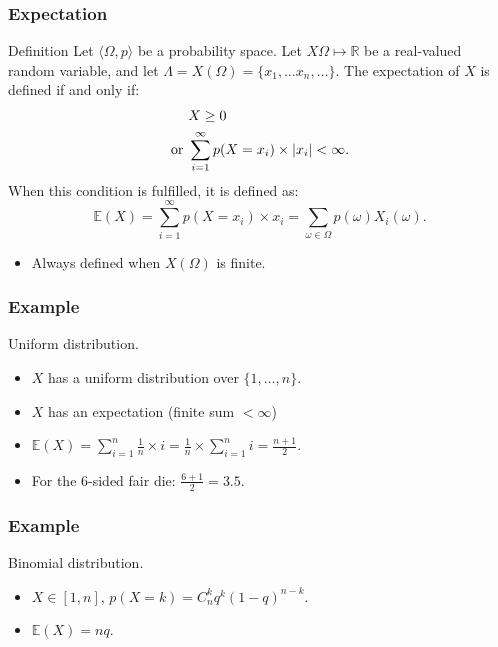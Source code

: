 \documentclass{beamer}
\begin{document}
\begin{frame}
  \frametitle{Expectation}
  \begin{block}{Definition}
    Let $\langle \Omega, p \rangle$ be a probability space. Let $X \Omega \mapsto \mathbb{R}$ be a real-valued random variable, and let $\Lambda = X(\Omega) = \{x_1, \dots x_n, \dots\}$. The expectation of $X$ is defined if and only if:
    \[\begin{aligned} &X \ge 0\\\textnormal{or }&\sum^{\infty}_{i=1} p(X = x_i) \times |x_i| < \infty.\end{aligned}\]
    When this condition is fulfilled, it is defined as:
    \[\mathbb{E}(X) = \sum^{\infty}_{i=1} p(X = x_i) \times x_i = \sum_{\omega \in \Omega} p(\omega) X_i(\omega) .\]
  \end{block}
  \begin{itemize}
  \item \alert{Always defined when $X(\Omega)$ is finite.}
  \end{itemize}
\end{frame}

\begin{frame}
  \frametitle{Example}
  \begin{exampleblock}{Uniform distribution.}
    \begin{itemize}
    \item $X$ has a uniform distribution over $\{1, \dots, n\}$.
    \item $X$ has an expectation (finite sum $< \infty$)
    \item $\mathbb{E}(X) = \sum^n_{i=1} \frac{1}{n} \times i = \frac{1}{n} \times \sum^n_{i = 1} i = \frac{n+1}{2}$.     
    \item For the $6$-sided fair die: $\frac{6+1}{2} = 3.5$.
    \end{itemize}
  \end{exampleblock}
\end{frame}

\begin{frame}
  \frametitle{Example}
  \begin{exampleblock}{Binomial distribution.}
    \begin{itemize}
    \item $X \in [1,n]$, $p(X = k) = C^k_n q^k(1-q)^{n-k}$.
    \item $\mathbb{E}(X) = nq$.
    \end{itemize}
  \end{exampleblock}
\end{frame}
\end{document}
